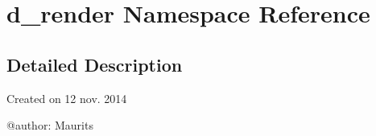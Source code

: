\hypertarget{namespaced__render}{}\section{d\+\_\+render Namespace Reference}
\label{namespaced__render}


\subsection{Detailed Description}
\begin{DoxyVerb}Created on 12 nov. 2014

@author: Maurits
\end{DoxyVerb}
 